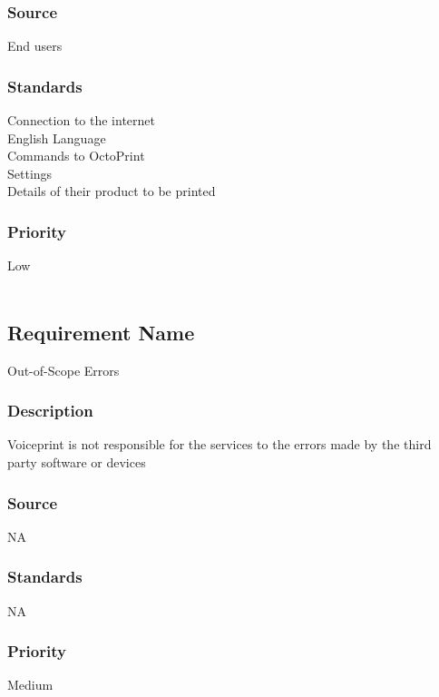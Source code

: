 \subsubsection{Source}
End users
\subsubsection{Standards}
Connection to the internet\\
English Language\\
Commands to OctoPrint\\
Settings\\
Details of their product to be printed
\subsubsection{Priority}
Low
\\
\\
\subsection{Requirement Name}
Out-of-Scope Errors
\subsubsection{Description}
Voiceprint is not responsible for the services to the errors made by the third party software or devices
\subsubsection{Source}
NA
\subsubsection{Standards}
NA
\subsubsection{Priority}
Medium
